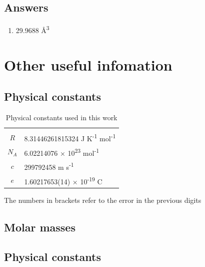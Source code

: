\documentclass[
]{book}
\providecommand{\tightlist}{%
  \setlength{\itemsep}{0pt}\setlength{\parskip}{0pt}}
\begin{document}
\hypertarget{answers}{%
\section{Answers}\label{answers}}

\begin{enumerate}
\def\labelenumi{\arabic{enumi}.}
\tightlist
\item
  29.9688 Å\textsuperscript{3}
\end{enumerate}

\hypertarget{other-useful-infomation}{%
\chapter{Other useful infomation}\label{other-useful-infomation}}

\hypertarget{physical-constants}{%
\section{Physical constants}\label{physical-constants}}

\begin{longtable}[]{@{}cl@{}}
\caption{Physical constants used in this work\label{tab:physicalconst}}\tabularnewline
\toprule
& \\
\midrule
\endfirsthead
\toprule
& \\
\midrule
\endhead
\(R\) & 8.31446261815324 J K\textsuperscript{-1} mol\textsuperscript{-1} \\
\(N_A\) & 6.02214076 × 10\textsuperscript{23} mol\textsuperscript{-1} \\
\(c\) & 299792458 m s\textsuperscript{-1} \\
\(e\) & 1.60217653(14) × 10\textsuperscript{-19} C \\
\bottomrule
\end{longtable}

The numbers in brackets refer to the error in the previous digits

\hypertarget{molar-masses}{%
\section{Molar masses}\label{molar-masses}}

\hypertarget{physical-constants-1}{%
\section{Physical constants}\label{physical-constants-1}}
\end{document}
